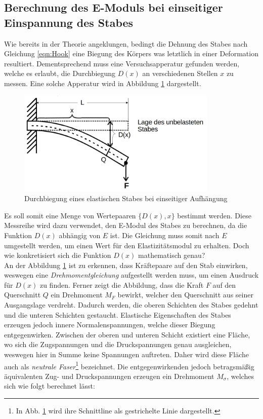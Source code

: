 \subsection{Berechnung des E-Moduls bei einseitiger Einspannung des Stabes}
\label{sec:Einseitig_t}

Wie bereits in der Theorie angeklungen, bedingt die Dehnung des Stabes nach Gleichung \eqref{eqn:Hook} eine Biegung des Körpers
was letztlich in einer Deformation resultiert. Dementsprechend muss eine Versuchsapperatur gefunden werden, welche es erlaubt,
die Durchbiegung $D(x)$ an verschiedenen Stellen $x$ zu messen. Eine solche Apperatur wird in Abbildung \ref{fig:Durchbiegung}
dargestellt.

\begin{figure}[H]
    \centering
    \includegraphics[height=5cm]{./content/Durchbiegung.png}
    \caption{Durchbiegung eines elastischen Stabes bei einseitiger Aufhängung}
    \label{fig:Durchbiegung}
\end{figure}

\noindent Es soll somit eine Menge von Wertepaaren $\{D(x),x\}$ bestimmt werden. Diese Messreihe wird dazu verwendet, den E-Modul
des Stabes zu berechnen, da die Funktion $D(x)$ abhängig von $E$ ist. Die Gleichung muss somit nach $E$ umgestellt werden, um 
einen Wert für den Elastizitätsmodul zu erhalten. Doch wie konkretisiert sich die Funktion $D(x)$ mathematisch genau?\\
An der Abbildung \ref{fig:Durchbiegung} ist zu erkennen, dass Kräftepaare auf den Stab einwirken, weswegen eine
\emph{Drehmomentgleichung} aufgestellt werden muss, um einen Ausdruck für $D(x)$ zu finden. Ferner zeigt die Abbildung, dass die Kraft $F$
auf den Querschnitt $Q$ ein Drehmoment $M_F$ bewirkt, welcher den Querschnitt aus seiner Ausgangslage verdreht. Dadurch werden,
die oberen Schichten des Stabes gedehnt und die unteren Schichten gestaucht. Elastische Eigenschaften des Stabes erzeugen jedoch
innere Normalenspannungen, welche dieser Biegung entgegenwirken. Zwischen der oberen und unteren Schicht existiert eine Fläche,
wo sich die Zugspannungen und die Druckspannungen genau ausgleichen, weswegen hier in Summe keine Spannungen 
auftreten. Daher wird diese Fläche auch als \emph{neutrale Faser}\footnote{In Abb. \ref{fig:Durchbiegung} wird ihre Schnittline als gestrichelte Linie dargestellt.} bezeichnet.
Die entgegenwirkenden jedoch betragsmäßig äquivalenten Zug- und Druckspannungen erzeugen ein Drehmoment $M_\sigma$, welches sich wie folgt
berechnet lässt:

